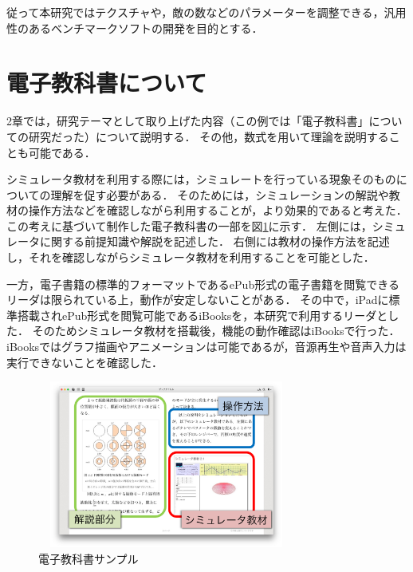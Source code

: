 \documentclass[twocolumn,10pt,a4j]{ltjsarticle}
\begin{document}
従って本研究ではテクスチャや，敵の数などのパラメーターを調整できる，汎用性のあるベンチマークソフトの開発を目的とする．


\section{電子教科書について}
2章では，研究テーマとして取り上げた内容（この例では「電子教科書」についての研究だった）について説明する．
その他，数式を用いて理論を説明することも可能である．

シミュレータ教材を利用する際には，シミュレートを行っている現象そのものについての理解を促す必要がある．
そのためには，シミュレーションの解説や教材の操作方法などを確認しながら利用することが，より効果的であると考えた．
この考えに基づいて制作した電子教科書の一部を図\ref{fig:教科書}に示す．
左側には，シミュレータに関する前提知識や解説を記述した．
右側には教材の操作方法を記述し，それを確認しながらシミュレータ教材を利用することを可能とした．

一方，電子書籍の標準的フォーマットであるePub形式の電子書籍を閲覧できるリーダは限られている上，動作が安定しないことがある．
その中で，iPadに標準搭載されePub形式を閲覧可能であるiBooksを，本研究で利用するリーダとした．
そのためシミュレータ教材を搭載後，機能の動作確認はiBooksで行った．
iBooksではグラフ描画やアニメーションは可能であるが，音源再生や音声入力は実行できないことを確認した．%

\begin{figure}[h]
\begin{center}
 \includegraphics[clip,width=85mm,height=55mm]{textbook.pdf}
\end{center}
 \caption{電子教科書サンプル}
 \label{fig:教科書}
\end{figure}
\end{document}

